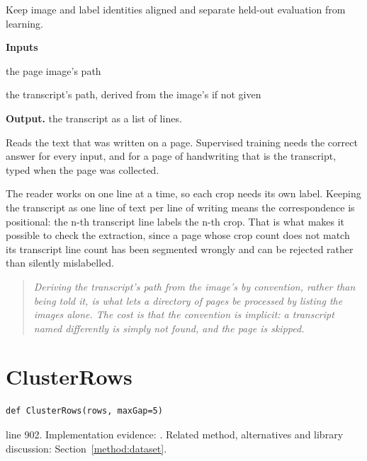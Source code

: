 Keep image and label identities aligned and separate held-out evaluation from learning.




\noindent\textbf{Inputs}
\begin{description}[leftmargin=2.2em,style=nextline,font=\normalfont\ttfamily]\setlength\itemsep{1pt}
  \item[{imgPath}] \normalfont the page image's path
  \item[{labelPath}] \normalfont the transcript's path, derived from the image's if not given
\end{description}

\noindent\textbf{Output.} the transcript as a list of lines.


Reads the text that was written on a page. Supervised training needs the correct answer for every input, and for a page of handwriting that is the transcript, typed when the page was collected.


The reader works on one line at a time, so each crop needs its own label. Keeping the transcript as one line of text per line of writing means the correspondence is positional: the n-th transcript line labels the n-th crop. That is what makes it possible to check the extraction, since a page whose crop count does not match its transcript line count has been segmented wrongly and can be rejected rather than silently mislabelled.


\begin{quote}\small\itshape Deriving the transcript's path from the image's by convention, rather than being told it, is what lets a directory of pages be processed by listing the images alone. The cost is that the convention is implicit: a transcript named differently is simply not found, and the page is skipped.\end{quote}


\section{ClusterRows}\label{fn:train:ClusterRows}
\begin{lstlisting}[style=sig]
def ClusterRows(rows, maxGap=5)
\end{lstlisting}
 line 902. Implementation evidence: \cite{code2026}. Related method, alternatives and library discussion: Section~\ref{method:dataset}.


